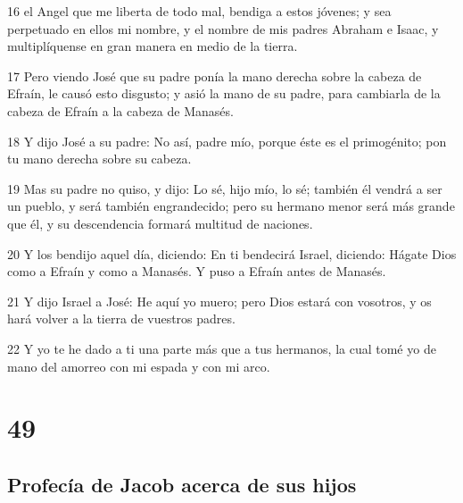 \par 16 el Angel que me liberta de todo mal, bendiga a estos jóvenes; y sea perpetuado en ellos mi nombre, y el nombre de mis padres Abraham e Isaac, y multiplíquense en gran manera en medio de la tierra.
\par 17 Pero viendo José que su padre ponía la mano derecha sobre la cabeza de Efraín, le causó esto disgusto; y asió la mano de su padre, para cambiarla de la cabeza de Efraín a la cabeza de Manasés.
\par 18 Y dijo José a su padre: No así, padre mío, porque éste es el primogénito; pon tu mano derecha sobre su cabeza.
\par 19 Mas su padre no quiso, y dijo: Lo sé, hijo mío, lo sé; también él vendrá a ser un pueblo, y será también engrandecido; pero su hermano menor será más grande que él, y su descendencia formará multitud de naciones.
\par 20 Y los bendijo aquel día, diciendo: En ti bendecirá Israel, diciendo: Hágate Dios como a Efraín y como a Manasés. Y puso a Efraín antes de Manasés.
\par 21 Y dijo Israel a José: He aquí yo muero; pero Dios estará con vosotros, y os hará volver a la tierra de vuestros padres.
\par 22 Y yo te he dado a ti una parte más que a tus hermanos, la cual tomé yo de mano del amorreo con mi espada y con mi arco.

\chapter{49}

\section*{Profecía de Jacob acerca de sus hijos}

